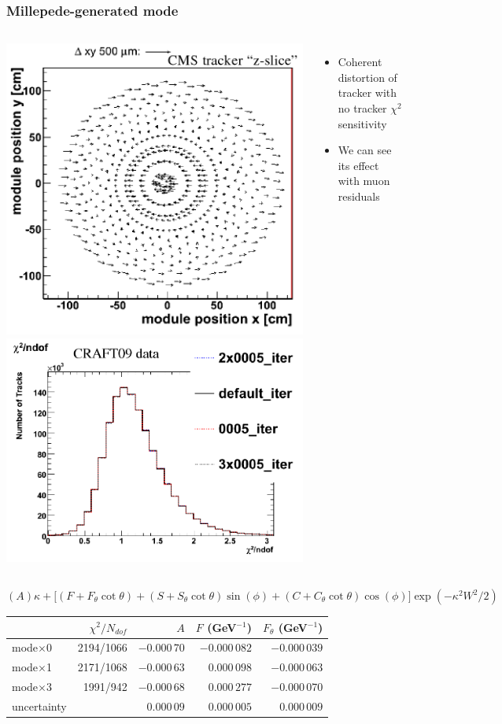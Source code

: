 \documentclass[compress]{beamer}
\begin{document}
\begin{frame}
\frametitle{Millepede-generated mode}

\begin{columns}
\includegraphics[width=0.5\linewidth]{stoye_deformation.png}
\includegraphics[width=0.5\linewidth]{chi2_invariance.png}

\begin{itemize}
\item Coherent distortion of tracker with no tracker $\chi^2$ sensitivity

\item We can see its effect with muon residuals
\end{itemize}
\end{columns}

\vfill
\scriptsize

$(A)\kappa + \big[(F + F_{\theta}\cot\theta) + (S + S_{\theta}\cot\theta)\sin(\phi) + (C + C_{\theta}\cot\theta)\cos(\phi)\big]\exp(-\kappa^2 W^2 / 2)$

\vfill

\begin{tabular}{l r r r r}
 & $\chi^2/N_{dof}$ & $A$\hspace{0.35 cm} & $F$ (GeV$^{-1}$) & $F_{\theta}$ (GeV$^{-1}$) \\\hline
mode$\times$0 & 2194/1066 & $-0.000\,70$ & $-0.000\,082$ & $-0.000\,039$ \\
mode$\times$1 & 2171/1068 & $-0.000\,63$ & $0.000\,098$ & $-0.000\,063$  \\
mode$\times$3 & 1991/942 & $-0.000\,68$ & $0.000\,277$ & $-0.000\,070$ \\\hline
uncertainty & & $0.000\,09$ & $0.000\,005$ & $0.000\,009$ \\
\end{tabular}


\end{frame}
\end{document}
